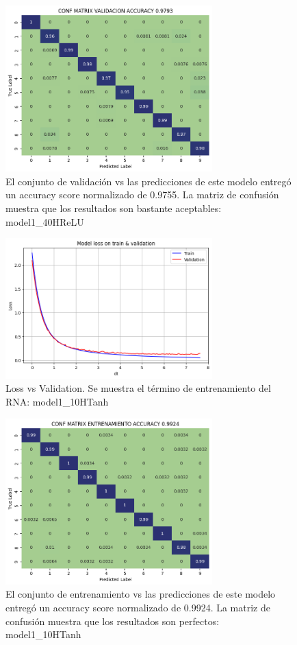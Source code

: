 \documentclass[journal]{IEEEtai}
\begin{document}
\begin{figure}[H]
\centering
\includegraphics[width=8cm]{img/betterAccuracyModel/val.png}
\caption{El conjunto de validación vs las predicciones de este modelo entregó un accuracy score normalizado de  0.9755. La matriz de confusión muestra que los resultados son bastante aceptables: model1\_40HReLU}
\label{fig: model140HReLUVAL}
\end{figure}

\begin{figure}[H]
\centering
\includegraphics[width=8cm]{img/model10HTanh/lossvsval.png}
\caption{Loss vs Validation. Se muestra el término de entrenamiento del RNA: model1\_10HTanh}
\label{fig: model110HTanhLOSSVSVAL}
\end{figure}

\begin{figure}[H]
\centering
\includegraphics[width=8cm]{img/model10HTanh/train.png}
\caption{El conjunto de entrenamiento vs las predicciones de este modelo entregó un accuracy score normalizado de  0.9924. La matriz de confusión muestra que los resultados son perfectos: model1\_10HTanh}
\label{fig: model110HTanhTRAIN}
\end{figure}
\end{document}
